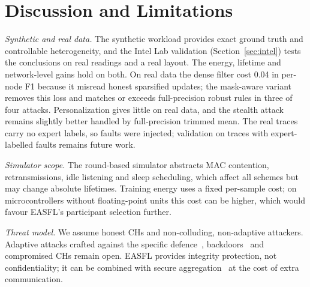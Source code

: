 \documentclass[journal]{IEEEtran}
\begin{document}
\section{Discussion and Limitations}
\textit{Synthetic and real data.} The synthetic workload provides exact ground truth and controllable heterogeneity, and the Intel Lab validation (Section~\ref{sec:intel}) tests the conclusions on real readings and a real layout. The energy, lifetime and network-level gains hold on both. On real data the dense filter cost 0.04 in per-node F1 because it misread honest sparsified updates; the mask-aware variant removes this loss and matches or exceeds full-precision robust rules in three of four attacks. Personalization gives little on real data, and the stealth attack remains slightly better handled by full-precision trimmed mean. The real traces carry no expert labels, so faults were injected; validation on traces with expert-labelled faults remains future work.

\textit{Simulator scope.} The round-based simulator abstracts MAC contention, retransmissions, idle listening and sleep scheduling, which affect all schemes but may change absolute lifetimes. Training energy uses a fixed per-sample cost; on microcontrollers without floating-point units this cost can be higher, which would favour EASFL's participant selection further.

\textit{Threat model.} We assume honest CHs and non-colluding, non-adaptive attackers. Adaptive attacks crafted against the specific defence~\cite{fang2020}, backdoors~\cite{bagdasaryan2020} and compromised CHs remain open. EASFL provides integrity protection, not confidentiality; it can be combined with secure aggregation~\cite{bonawitz2017} at the cost of extra communication.
\end{document}
